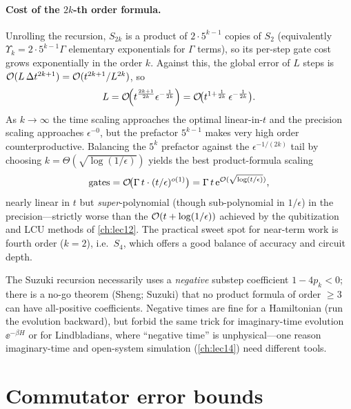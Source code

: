 \paragraph{Cost of the $2k$-th order formula.}
Unrolling the recursion, $S_{2k}$ is a product of $2\cdot5^{k-1}$ copies of $S_2$
(equivalently $\Upsilon_k=2\cdot5^{k-1}\Gamma$ elementary exponentials for $\Gamma$
terms), so its per-step gate cost grows exponentially in the order $k$. Against this, the
global error of $L$ steps is $\mathcal{O}(L\,\Delta t^{2k+1})=\mathcal{O}(t^{2k+1}/L^{2k})$, so
\begin{equation}
  L=\mathcal{O}\!\Bigl(t^{\frac{2k+1}{2k}}\epsilon^{-\frac{1}{2k}}\Bigr)
   =\mathcal{O}\!\bigl(t^{1+\frac{1}{2k}}\,\epsilon^{-\frac{1}{2k}}\bigr).
  \label{eq:lec11-suzuki-L}
\end{equation}
As $k\to\infty$ the time scaling approaches the optimal linear-in-$t$ and the precision
scaling approaches $\epsilon^{-0}$, but the prefactor $5^{k-1}$ makes very high order
counterproductive. Balancing the $5^{k}$ prefactor against the $\epsilon^{-1/(2k)}$ tail
by choosing $k=\Theta(\sqrt{\log(1/\epsilon)})$ yields the best product-formula scaling
\begin{equation}
  \text{gates}=\mathcal{O}\!\bigl(\Gamma\, t\cdot(t/\epsilon)^{o(1)}\bigr)
  =\Gamma\,t\,\mathrm{e}^{\mathcal{O}(\sqrt{\log(t/\epsilon)})},
  \label{eq:lec11-suzuki-opt}
\end{equation}
nearly linear in $t$ but \emph{super}-polynomial (though sub-polynomial in $1/\epsilon$)
in the precision---strictly worse than the $\mathcal{O}(t+\log(1/\epsilon))$ achieved by the
qubitization and LCU methods of \cref{ch:lec12}. The practical sweet spot for near-term
work is fourth order ($k=2$), i.e.\ $S_4$, which offers a good balance of accuracy and
circuit depth.

\begin{remark}
\label{rem:lec11-negative}
The Suzuki recursion necessarily uses a \emph{negative} substep coefficient
$1-4p_k<0$; there is a no-go theorem (Sheng; Suzuki) that no product formula of order
$\ge3$ can have all-positive coefficients. Negative times are fine for a Hamiltonian
(run the evolution backward), but forbid the same trick for imaginary-time evolution
$\ee^{-\beta H}$ or for Lindbladians, where ``negative time'' is unphysical---one reason
imaginary-time and open-system simulation (\cref{ch:lec14}) need different tools.
\end{remark}

\section{Commutator error bounds}
\label{sec:lec11-4}

